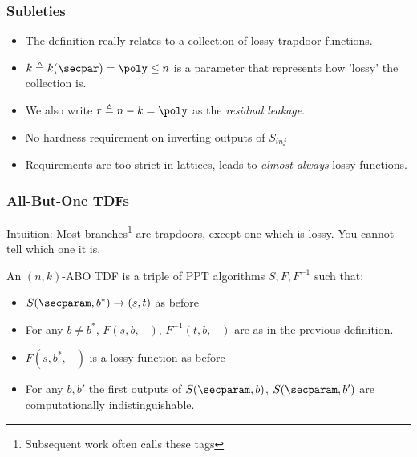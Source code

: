 \documentclass{beamer}
\begin{document}
\begin{frame}
    \frametitle{Subleties}
    \begin{itemize}
        \item The definition really relates to a collection of lossy trapdoor functions.
        \item $k \triangleq k(\secpar) = \poly \leq n$ is a parameter that represents how 'lossy' the collection is.
        \item We also write $r \triangleq n-k = \poly$ as the \textit{residual leakage}.
        \item No hardness requirement on inverting outputs of $S_{inj}$
        \item Requirements are too strict in lattices, leads to \textit{almost-always} lossy functions.
    \end{itemize}
\end{frame}

\begin{frame}
    \frametitle{All-But-One TDFs}
    Intuition: Most branches\footnote{Subsequent work often calls these tags} are trapdoors, except one which is lossy. You cannot tell which one it is.
    \begin{definition}
        An $(n, k)$-ABO TDF is a triple of PPT algorithms $S, F, F^{-1}$ such that:
        \begin{itemize}
            \item $S(\secparam, b^*) \rightarrow (s, t)$ as before
            \item For any $b \neq b^*$, $F(s, b, {-})$, $F^{-1}(t, b, {-})$ are as in the previous definition.
            \item $F(s, b^*, {-})$ is a lossy function as before
            \item For any $b,b'$ the first outputs of $S(\secparam, b)$, $S(\secparam, b')$ are computationally indistinguishable.
        \end{itemize}
    \end{definition}
\end{frame}
\end{document}
